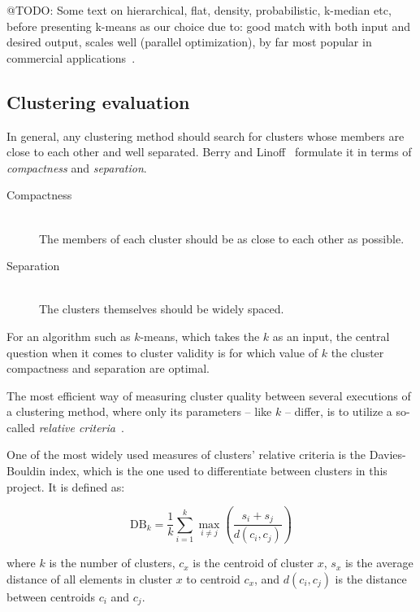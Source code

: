 @TODO: Some text on hierarchical, flat, density, probabilistic, k-median etc, before presenting k-means as our choice due to: good match with both input and desired output, scales well (parallel optimization), by far most popular in commercial applications~\cite{Berkhin2006}.

\subsection{Clustering evaluation}
\label{survey:sub:clustering_evaluation}

In general, any clustering method should search for clusters whose members are close to each other and well separated. Berry and Linoff~\cite{Berry1996} formulate it in terms of \emph{compactness} and \emph{separation}.

\begin{description}
  \item[Compactness] \hfill \\
    The members of each cluster should be as close to each other as possible.
  \item[Separation] \hfill \\
    The clusters themselves should be widely spaced.
\end{description}

For an algorithm such as $k$-means, which takes the $k$ as an input, the central question when it comes to cluster validity is for which value of $k$ the cluster compactness and separation are optimal.

The most efficient way of measuring cluster quality between several executions of a clustering method, where only its parameters -- like $k$ -- differ, is to utilize a so-called \emph{relative criteria}~\cite{Halkidi2001}.

One of the most widely used measures of clusters' relative criteria is the Davies-Bouldin index, which is the one used to differentiate between clusters in this project. It is defined as:

\begin{equation}
  \text{DB}_k = \frac{1}{k} \sum_{i=1}^k \max_{i \neq j} \left( \frac{s_i + s_j}{d(c_i, c_j)} \right)
\end{equation}

where $k$ is the number of clusters, $c_x$ is the centroid of cluster $x$, $s_x$ is the average distance of all elements in cluster $x$ to centroid $c_x$, and $d(c_i,c_j)$ is the distance between centroids $c_i$ and $c_j$.

